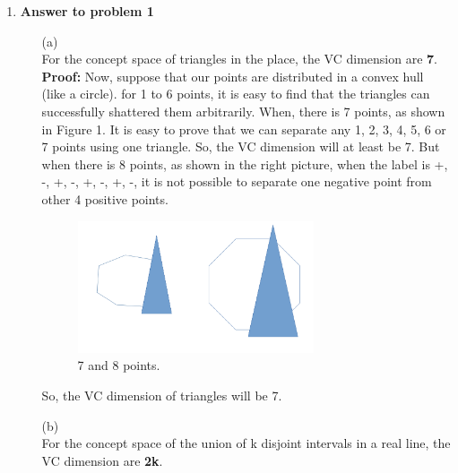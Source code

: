 

\usepackage{graphicx,amssymb,amsmath, listings}
\lstset{language = Matlab}
\lstset{breaklines}
\lstset{extendedchars=false}

\oddsidemargin 0in
\evensidemargin 0in
\textwidth 6.5in
\topmargin -0.5in
\textheight 9.0in



\pagestyle{myheadings}  %

\begin{enumerate}
\item {\bf Answer to problem 1}
\begin{enumerate}
\item[(a)\\]
For the concept space of triangles in the place, the VC dimension are {\bf 7}.\\

{\bf Proof:} Now, suppose that our points are distributed in a convex hull (like a circle). for 1 to 6 points, it is easy to find that the triangles can successfully shattered them arbitrarily. When, there is 7 points, as shown in Figure 1. It is easy to prove that we can separate any 1, 2, 3, 4, 5, 6 or 7 points using one triangle. So, the VC dimension will at least be 7. But when there is 8 points, as shown in the right picture, when the label is +, -, +, -, +, -, +, -, it is not possible to separate one negative point from other 4 positive points.
\begin{figure}[h!]

  \centering
    \includegraphics[width=0.7\textwidth]{7.png}
      \caption{7 and 8 points.}
\end{figure}

So, the VC dimension of triangles will be 7.\\

\item[(b)\\]
For the concept space of the union of k disjoint intervals in a real line, the VC dimension are {\bf 2k}.\\


\end{enumerate}
\end{enumerate}
